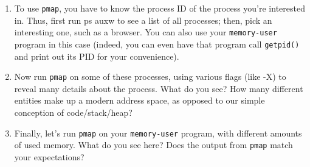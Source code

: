 \documentclass[12pt]{article}
\begin{document}
\begin{enumerate}[1.]
    \item To use \texttt{pmap}, you have to know the process ID of the process you’re
    interested in. Thus, first run ps auxw to see a list of all processes;
    then, pick an interesting one, such as a browser. You can also use
    your \texttt{memory-user} program in this case (indeed, you can even
    have that program call \texttt{getpid()} and print out its PID for your
    convenience).

    \item Now run \texttt{pmap} on some of these processes, using various flags (like
    -X) to reveal many details about the process. What do you see?
    How many different entities make up a modern address space, as
    opposed to our simple conception of code/stack/heap?

    \item Finally, let’s run \texttt{pmap} on your \texttt{memory-user} program, with different amounts of used memory. What do you see here? Does the
    output from \texttt{pmap} match your expectations?
\end{enumerate}
\end{document}

